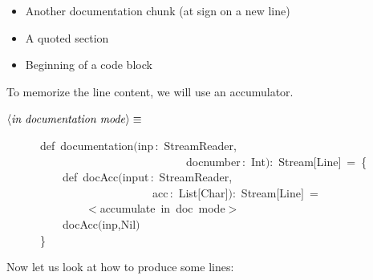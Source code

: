 \documentclass[a4paper,12pt]{article}
\begin{document}
\begin{itemize}
\item Another documentation chunk (at sign on a new line)
\item A quoted section
\item Beginning of a code block
\end{itemize}

To memorize the line content, we will use an accumulator.

$\left<\mbox{\emph{in documentation mode}}\right>\equiv$
\begin{program}~~~~~~{\vem def}~documentation$($inp\,{\rm :}~StreamReader,
\\~~~~~~~~~~~~~~~~~~~~~~~~~~~~~~~~docnumber\,{\rm :}~Int$)${\rm :}~Stream$[$Line$]$~=~{\small\{}
\\~~~~~~~~~~{\vem def}~docAcc$($input\,{\rm :}~StreamReader,
\\~~~~~~~~~~~~~~~~~~~~~~~~~~acc\,{\rm :}~List$[$Char$]$$)${\rm :}~Stream$[$Line$]$~=
\\~~~~~~~~~~~~~~$<$accumulate~in~doc~mode$>$
\\[0.5em]~~~~~~~~~~docAcc$($inp,Nil$)$
\\~~~~~~{\small\}}
\\[0.5em]\end{program}
Now let us look at how to produce some lines:
\end{document}
